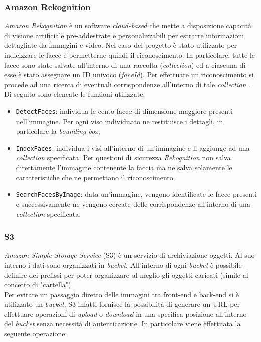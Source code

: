 	\subsubsection{Amazon Rekognition}
	
	\emph{Amazon Rekognition} è un software \emph{cloud-based} che mette a disposizione capacità di visione artificiale pre-addestrate e personalizzabili per estrarre informazioni dettagliate da immagini e video. Nel caso del progetto è stato utilizzato per indicizzare le facce e permetterne quindi il riconoscimento. In particolare, tutte le facce sono state salvate all'interno di una raccolta (\emph{collection}) ed a ciascuna di esse è stato assegnare un ID univoco (\emph{faceId}). Per effettuare un riconoscimento si procede ad una ricerca di eventuali corrispondenze all'interno di tale \emph{collection} . \\
	Di seguito sono elencate le funzioni utilizzate:
	\begin{itemize}
		\item \texttt{DetectFaces}: individua le cento facce di dimensione maggiore presenti nell'immagine. Per ogni viso individuato ne restituisce i dettagli, in particolare la \emph{bounding box};
		\item \texttt{IndexFaces}: individua i visi all'interno di un'immagine e li aggiunge ad una \emph{collection} specificata. Per questioni di sicurezza \emph{Rekognition} non salva direttamente l'immagine contenente la faccia ma ne salva solamente le caratteristiche che ne permettano il riconoscimento.
		\item \texttt{SearchFacesByImage}: data un'immagine, vengono identificate le facce presenti e successivamente ne vengono cercate delle corrispondenze all'interno di una \emph{collection} specificata.
		
	\end{itemize} 
	
	\subsubsection{S3}
	\emph{Amazon Simple Storage Service} (S3) è un servizio di archiviazione oggetti. Al suo interno i dati sono organizzati in \emph{bucket}. All'interno di ogni \emph{bucket} è possibile definire dei prefissi per poter organizzare al meglio gli oggetti caricati (simile al concetto di "cartella"). \\ 
	Per evitare un passaggio diretto delle immagini tra front-end e back-end si è utilizzato un \emph{bucket}. S3 infatti fornisce la possibilità di generare un URL per effettuare operazioni di \emph{upload} o \emph{download} in una specifica posizione all'interno del \emph{bucket} senza necessità di autenticazione. In particolare viene effettuata la seguente operazione:
%		

